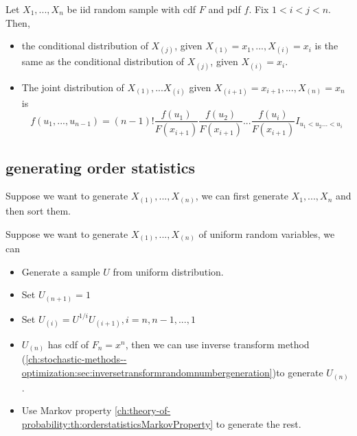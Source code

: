 \begin{refsection}
\begin{theorem}\label{ch:theory-of-probability:th:orderstatisticsMarkovProperty}
Let $X_1,...,X_n$ be iid random sample with cdf $F$ and pdf $f$. Fix $1<i<j<n$. Then, 
\begin{itemize}
	\item the conditional distribution of $X_{(j)}$, given $X_{(1)} = x_1,...,X_{(i)}=x_i$ is the same as the conditional distribution of $X_{(j)}$, given $X_{(i)}=x_i$.
	\item The joint distribution of $X_{(1)},...X_{(i)}$ given $X_{(i+1)} = x_{i+1},...,X_{(n)}=x_n$ is
	$$f(u_1,...,u_{n-1}) = (n-1)! \frac{f(u_1)}{F(x_{i+1})}\frac{f(u_2)}{F(x_{i+1})}...\frac{f(u_i)}{F(x_{i+1})}I_{u_1<u_2...<u_i}$$
\end{itemize}
\end{theorem}






\subsection{generating order statistics}

\begin{definition}
Suppose we want to generate $X_{(1)},...,X_{(n)}$, we can first generate $X_1,...,X_n$ and then sort them.
\end{definition}


\begin{definition}\cite{pasha2005sampling}
Suppose we want to generate $X_{(1)},...,X_{(n)}$ of uniform random variables, we can
\begin{itemize}
	\item Generate a sample $U$ from uniform distribution.
	\item Set $U_{(n+1)} = 1$
	\item Set $U_{(i)} = U^{1/i} U_{(i+1)},i=n,n-1,...,1$
\end{itemize}
\end{definition}

\begin{remark}[interpretation]\hfill
\begin{itemize}
	\item $U_{(n)}$ has cdf of $F_n = x^n$, then we can use inverse transform method (\autoref{ch:stochastic-methods--optimization:sec:inversetransformrandomnumbergeneration})to generate $U_{(n)}$.
	\item Use Markov property \autoref{ch:theory-of-probability:th:orderstatisticsMarkovProperty} to generate the rest.
\end{itemize}
	

\end{remark}
\end{refsection}
